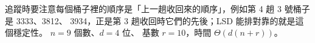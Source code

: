 \begin{pastsoln}
追蹤時要注意每個桶子裡的順序是「上一趟收回來的順序」，例如第 4 趟 $3$ 號桶子是 3333、3812、
3934，正是第 3 趟收回時它們的先後；LSD 能排對靠的就是這個穩定性。 $n = 9$ 個數、$d = 4$ 位、
基數 $r = 10$，時間 $\Theta(d(n + r))$。
\end{pastsoln}
